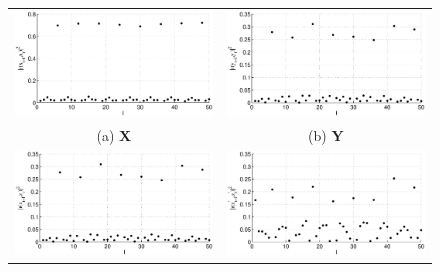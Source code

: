 \documentclass{article}[10pt]
\begin{document}
\begin{figure}[ht]
\begin{tabular}{cc}
\includegraphics[scale=0.48]{NoisyMultiResponseExample_autocorrX.eps} & \includegraphics[scale=0.48]{NoisyMultiResponseExample_autocorrY.eps} \\
(a) $\mathbf{X}$ & (b) $\mathbf{Y}$ \\
\includegraphics[scale=0.48]{NoisyMultiResponseExample_autocorrZ1.eps} & \includegraphics[scale=0.48]{NoisyMultiResponseExample_autocorrZ2.eps} \\

\end{tabular}
\end{figure}
\end{document}
